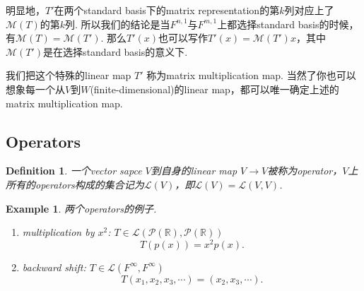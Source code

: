 \documentclass{article}
\newtheorem{example}[theorem]{Example}
\newtheorem{definition}[theorem]{Definition}
\begin{document}
\begin{center}
\end{center}
明显地，$T'$在两个standard basis下的matrix representation的第$k$列对应上了$\mathcal{M}(T)$的第$k$列. {\color{blue}所以我们的结论是当$F^{n,1}$与$F^{m,1}$上都选择standard basis的时候，有$\mathcal{M}(T) = \mathcal{M}(T')$}. 那么$T'(x)$也可以写作$T'(x) = \mathcal{M}(T')x$，其中$\mathcal{M}(T')$是在选择standard basis的意义下.


我们把这个特殊的linear map $T'$ 称为{\color{red}matrix multiplication map}. 当然了你也可以想象每一个从$V$到$W$(finite-dimensional)的linear map，都可以唯一确定上述的matrix multiplication map.

\newpage
\subsection{Operators}

\begin{definition}
\rm 一个vector sapce $V$到自身的linear map $V \rightarrow V$被称为operator，$V$上所有的operators构成的集合记为$\mathcal{L}(V)$，即$\mathcal{L}(V)=\mathcal{L}(V,V)$.
\end{definition}

\begin{example}
两个operators的例子.
\begin{enumerate}
	\item multiplication by $x^2$: $T \in \mathcal{L}(\mathcal{P}(\mathbb{R}),\mathcal{P}(\mathbb{R}))$
	$$
		T(p(x)) = x^2p(x).
	$$
	\item backward shift: $T \in \mathcal{L}(F^{\infty},F^{\infty})$
	$$
		T(x_1,x_2,x_3,\cdots) = (x_2,x_3,\cdots). 
	$$
\end{enumerate}
\end{example}
\end{document}
